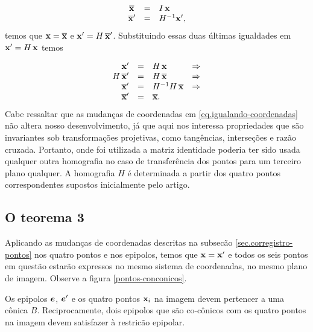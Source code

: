 \begin{equation}\label{eq.igualando-coordenadas}
\begin{array}{rcl}
\overline{\mathbf{x}}\,&=&I\,\mathbf{x}\\
\overline{\mathbf{x}}'&=&H^{-1}\mathbf{x}',
\end{array}
\end{equation}
temos que $\mathbf{x}=\overline{\mathbf{x}}$ e $\mathbf{x}'=H\,\overline{\mathbf{x}}'$. Substituindo essas duas últimas igualdades em $\mathbf{x}'=H\,\mathbf{x}$ temos

\begin{equation*}
\begin{array}{rcll}
\mathbf{x}'&=&H\,\mathbf{x}&\Rightarrow\\
H\,\overline{\mathbf{x}}'&=&H\,\overline{\mathbf{x}}&\Rightarrow\\
\overline{\mathbf{x}}'&=&H^{-1}H\,\overline{\mathbf{x}}&\Rightarrow\\
\overline{\mathbf{x}}'&=&\overline{\mathbf{x}}.&
\end{array}
\end{equation*}
Cabe ressaltar que as mudanças de coordenadas em \ref{eq.igualando-coordenadas} não altera nosso desenvolvimento, já que aqui nos interessa propriedades que são invariantes sob transformações projetivas, como tangências, interseções e raz\~ao cruzada. Portanto, onde foi utilizada a matriz identidade poderia ter sido usada qualquer outra homografia no caso de transferência dos pontos para um terceiro plano qualquer. A homografia $H$ é determinada a partir dos quatro pontos correspondentes supostos inicialmente pelo artigo.

\subsection{O teorema 3}\label{sec.teorema-3}

Aplicando as mudanças de coordenadas descritas na subsec\~ao \ref{sec.corregistro-pontos} nos quatro pontos e nos epipolos, temos que $\mathbf{x}=\mathbf{x}'$ e todos os seis pontos em questão estarão expressos no mesmo sistema de coordenadas, no mesmo plano de imagem. Observe a figura \ref{pontos-conconicos}.

\begin{teorema}
Os epipolos $\boldsymbol{e}$, $\boldsymbol{e}'$ e os quatro pontos $\mathbf{x}_i$ na imagem devem pertencer a uma cônica $B$. Reciprocamente, dois epipolos que são co-cônicos com os quatro pontos na imagem devem satisfazer à restricão epipolar.
\end{teorema}

